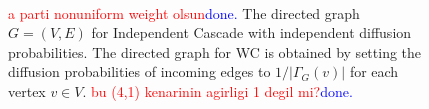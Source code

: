 \documentclass[10pt,journal,compsoc]{IEEEtran}
\newcommand\ggx[1]{\textcolor{blue}{#1}}
\newcommand\kktodo[1]{\textcolor{red}{#1}}
\begin{document}
\begin{figure}[!ht] 
    \centering
    \\%
  \caption{\protect{} 
\kktodo{a parti nonuniform weight olsun}\ggx{done.} The directed graph $G = (V, E)$ for Independent Cascade with independent diffusion probabilities. 
\protect{}
The directed graph for WC is obtained by setting the diffusion probabilities of incoming edges to $1 / |\Gamma_G(v)|$ for each vertex $v \in V$. \kktodo{bu (4,1) kenarinin agirligi 1 degil mi?}\ggx{done.} 
  }
  \label{fig:xx} 
\end{figure}
\end{document}
